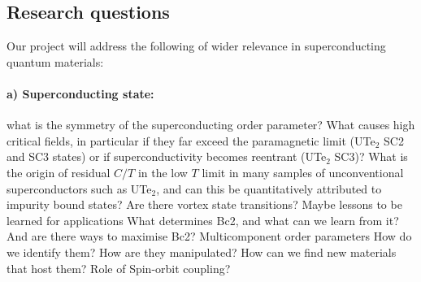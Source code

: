 
 
\subsection*{Research questions}
\noindent
Our project will address the following  of wider relevance in superconducting quantum materials:




\paragraph{a) Superconducting state:} what is the symmetry of the superconducting order parameter? What causes high critical fields, in particular if they far exceed the paramagnetic limit (UTe$_2$ SC2 and SC3 states) or if superconductivity becomes reentrant (UTe$_2$ SC3)? %
What is the origin of residual $C/T$ in the low $T$ limit in many samples of unconventional superconductors such as UTe$_2$, and can this be quantitatively attributed to impurity bound states? 
Are there vortex state transitions?
Maybe lessons to be learned for applications
What determines Bc2, and what can we learn from it? 
And are there ways to maximise Bc2?
Multicomponent order parameters
How do we identify them? How are they manipulated? How can we find new materials that host them? Role of Spin-orbit coupling?

